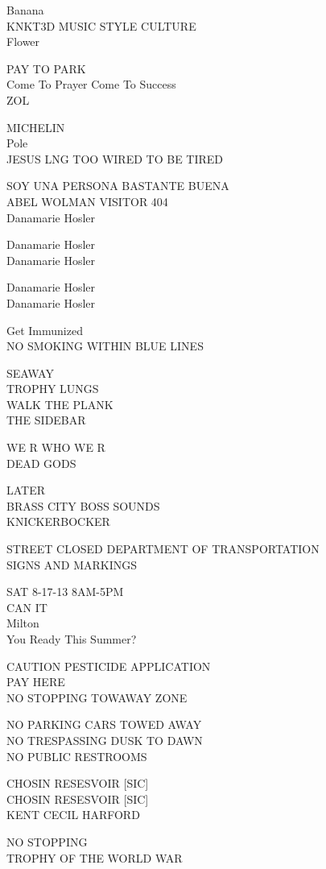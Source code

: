\documentclass[10pt,letterpaper]{article}
\begin{document}
Banana\\
KNKT3D MUSIC STYLE CULTURE\\
Flower

PAY TO PARK\\
Come To Prayer Come To Success\\
ZOL

MICHELIN\\
Pole\\
JESUS LNG TOO WIRED TO BE TIRED

SOY UNA PERSONA BASTANTE BUENA\\
ABEL WOLMAN VISITOR 404\\
Danamarie Hosler

Danamarie Hosler\\
Danamarie Hosler

Danamarie Hosler\\
Danamarie Hosler

Get Immunized\\
NO SMOKING WITHIN BLUE LINES

SEAWAY\\
TROPHY LUNGS\\
WALK THE PLANK\\
THE SIDEBAR

WE R WHO WE R\\
DEAD GODS

LATER\\
BRASS CITY BOSS SOUNDS\\
KNICKERBOCKER

STREET CLOSED DEPARTMENT OF TRANSPORTATION\\
SIGNS AND MARKINGS

SAT 8{-}17{-}13 8AM{-}5PM\\
CAN IT\\
Milton\\
You Ready This Summer?

CAUTION PESTICIDE APPLICATION\\
PAY HERE\\
NO STOPPING TOWAWAY ZONE

NO PARKING CARS TOWED AWAY\\
NO TRESPASSING DUSK TO DAWN\\
NO PUBLIC RESTROOMS

CHOSIN RESESVOIR {[}SIC{]}\\
CHOSIN RESESVOIR {[}SIC{]}\\
KENT CECIL HARFORD

NO STOPPING\\
TROPHY OF THE WORLD WAR
\end{document}
